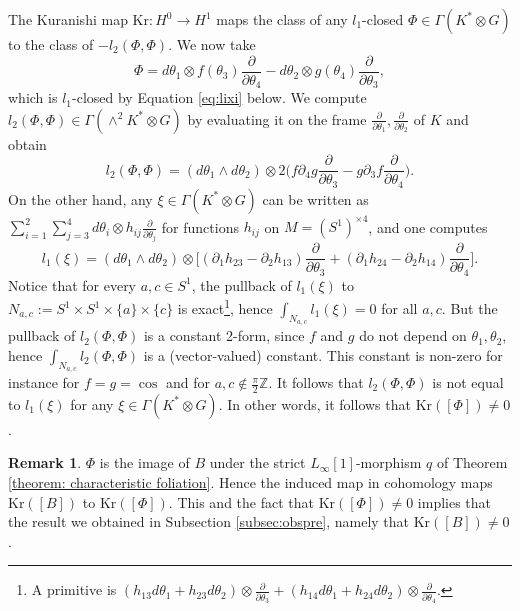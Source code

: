 \documentclass[11pt,thmsa]{amsart}
\theoremstyle{definition}
\newtheorem{remark}[theorem]{Remark}
\newcommand{\ZZ}{\ensuremath{\mathbb Z}}
\begin{document}
 The Kuranishi map  
$\mathrm{Kr}\colon H^0\to H^1$ maps the class of  any $l_1$-closed $\Phi\in \Gamma(K^*\otimes G)$ to the class of $-l_2(\Phi,\Phi)$.  
We now take $$\Phi=d\theta_1\otimes f(\theta_3)\frac{\partial}{\partial \theta_4}-
d\theta_2  \otimes g(\theta_4)\frac{\partial}{\partial \theta_3},$$
which is $l_1$-closed by Equation \eqref{eq:lixi} below.
We compute $l_2(\Phi,\Phi)\in \Gamma(\wedge^2 K^*\otimes G)$ by evaluating it on the frame $\frac{\partial}{\partial \theta_1}, \frac{\partial}{\partial \theta_2}$ of $K$ and obtain 
$$l_2(\Phi,\Phi)= (d\theta_1\wedge d\theta_2) \otimes 2\big(f{\partial_4 g}\frac{\partial}{\partial \theta_3}- g {\partial_3 f}\frac{\partial}{\partial \theta_4}\big).$$
On the other hand,  any $\xi\in \Gamma(K^*\otimes G)$ can be written as $\sum_{i=1}^2\sum_{j=3}^4 d\theta_i\otimes h_{ij}
\frac{\partial}{\partial \theta_j}$ for functions $h_{ij}$ on $M=(S^1)^{\times 4}$, and one computes
\begin{equation}\label{eq:lixi}
l_1(\xi)= (d\theta_1\wedge d\theta_2) \otimes\big[({\partial_1}h_{23}- {\partial_2}h_{13})\frac{\partial}{\partial \theta_3}+
({\partial_1}h_{24}- {\partial_2}h_{14})\frac{\partial}{\partial \theta_4}\big].
\end{equation}
Notice that for every $a,c\in S^1$, the pullback of   $l_1(\xi)$
to $N_{a,c}:=S^1\times S^1\times \{a\}\times \{c\}$ is exact\footnote{A primitive is $(h_{13}d\theta_1+h_{23}d\theta_2)\otimes \frac{\partial}{\partial \theta_3}+ 
(h_{14}d\theta_1+h_{24}d\theta_2)\otimes \frac{\partial}{\partial \theta_4}$.}, hence
$\int_{N_{a,c}}l_1(\xi)=0$ for all $a,c$.
But the pullback of $l_2(\Phi,\Phi)$ is a constant 2-form, since $f$ and $g$ do not depend on $\theta_1,\theta_2$, hence $\int_{N_{a,c}}l_2(\Phi,\Phi)$ 
is a (vector-valued) constant. This constant 
 is non-zero for instance for $f=g=\cos$ and for $a,c\notin \frac{\pi}{2}\ZZ$. It follows that  $l_2(\Phi,\Phi)$ is not equal to 
$l_1(\xi)$ for any $\xi\in \Gamma(K^*\otimes G)$. In other words, it follows that  $\mathrm{Kr}([\Phi])\neq 0$.
\begin{remark}
$\Phi$ is the image of $B$ under the strict $L_{\infty}[1]$-morphism $q$ of Theorem \ref{theorem: characteristic foliation}. Hence the induced map in cohomology maps $\mathrm{Kr}([B])$ to $\mathrm{Kr}([\Phi])$. This and the fact that $\mathrm{Kr}([\Phi])\neq 0$ implies that 
the result we obtained in Subsection \ref{subsec:obspre}, namely that $\mathrm{Kr}([B])\neq 0$.
\end{remark}
\end{document}
